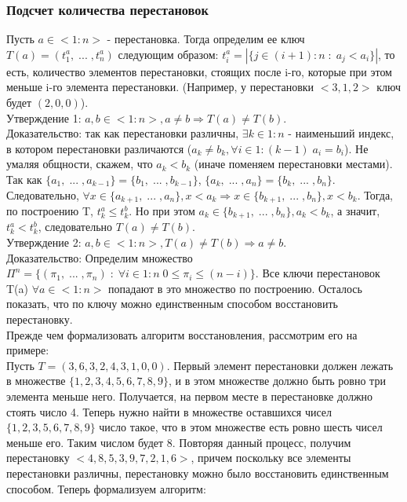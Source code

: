 \subsubsection{Подсчет количества перестановок}
Пусть $a \in <1:n>$ - перестановка. Тогда определим ее ключ $T(a) = (t^a_1, \; ... \; , t^a_n)$ следующим образом: $t^a_i = |\{j \in (i + 1):n \; : \; a_j < a_i\}|$, то есть, количество элементов перестановки, стоящих после i-го, которые при этом меньше i-го элемента перестановки. (Например, у перестановки $<3, 1, 2>$ ключ будет $(2, 0, 0)$).\\
Утверждение 1: $a, b \in <1:n>, a \not= b \Rightarrow T(a) \not= T(b)$.\\
Доказательство: так как перестановки различны, $\exists k \in 1:n$ - наименьший индекс, в котором перестановки различаются ($a_k \not= b_k, \forall i \in 1:(k - 1) \; a_i = b_i$). Не умаляя общности, скажем, что $a_k < b_k$ (иначе поменяем перестановки местами).\\
Так как $\{a_1, \; ... \; , a_{k - 1}\} = \{b_1, \; ... \; , b_{k - 1}\}$, $\{a_k, \; ... \; , a_n\} = \{b_k, \; ... \; , b_n\}$.\\
Следовательно, $\forall x \in \{a_{k + 1}, \; ... \; , a_n\}, x < a_k \Rightarrow x \in \{b_{k + 1}, \; ... \; , b_n\}, x < b_k$. Тогда, по построению T, $t^a_k \leq t^b_k$. Но при этом $a_k \in \{b_{k + 1}, \; ... \; , b_n\}, a_k < b_k$, а значит, $t^a_k < t^b_k$, следовательно $T(a) \not= T(b)$.\\
Утверждение 2: $a, b \in <1:n>, T(a)\not= T(b) \Rightarrow a \not= b$.\\
Доказательство: Определим множество $\Pi^n = \{(\pi_1, \; ... \; , \pi_n) \; : \; \forall i \in 1:n \; 0 \leq \pi_i \leq (n - i)\}$. Все ключи перестановок T(a) $\forall a \in <1:n>$ попадают в это множество по построению. Осталось показать, что по ключу можно единственным способом восстановить перестановку.\\
Прежде чем формализовать алгоритм восстановления, рассмотрим его на примере:\\
Пусть $T = (3, 6, 3, 2, 4, 3, 1, 0, 0)$. Первый элемент перестановки должен лежать в множестве $\{1, 2, 3, 4, 5, 6, 7, 8, 9\}$, и в этом множестве должно быть ровно три элемента меньше него. Получается, на первом месте в перестановке должно стоять число 4. Теперь нужно найти в множестве оставшихся чисел $\{1, 2, 3, 5, 6, 7, 8, 9\}$ число такое, что в этом множестве есть ровно шесть чисел меньше его. Таким числом будет 8. Повторяя данный процесс, получим перестановку $<4, 8, 5, 3, 9, 7, 2, 1, 6>$, причем поскольку все элементы перестановки различны, перестановку можно было восстановить единственным способом. Теперь формализуем алгоритм:\\
